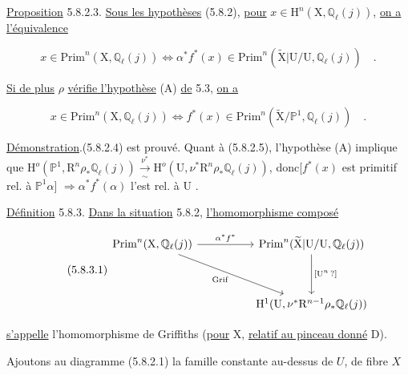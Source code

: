 \underline{Proposition} 5.8.2.3. \underline{Sous les hypothèses} (5.8.2), \underline{pour} $x \in \mathrm{H}^n(\mathrm{X},\mathbb{Q}_\ell(j))$, \underline{on a l'équivalence}

\begin{equation}\tag{5.8.2.4}
x \in \mathrm{Prim}^n(\mathrm{X},\mathbb{Q}_\ell(j)) \Longleftrightarrow \alpha^*f^*(x) \in \mathrm{Prim}^n(\widetilde{\mathrm{X}}|\mathrm{U}/\mathrm{U},\mathbb{Q}_\ell(j)) \quad .
\end{equation}

\underline{Si de plus} $\rho$ \underline{vérifie l'hypothèse} (A) \underline{de} 5.3, \underline{on a}

\begin{equation}\tag{5.8.2.5}
x \in \mathrm{Prim}^n(\mathrm{X},\mathbb{Q}_\ell(j)) \Longleftrightarrow f^*(x) \in \mathrm{Prim}^n(\widetilde{\mathrm{X}}/ \mathbb{P}^1,\mathbb{Q}_\ell(j)) \quad .
\end{equation}

\underline{Démonstration}.(5.8.2.4) est prouvé. Quant à (5.8.2.5), l'hypothèse (A) implique que $\mathrm{H}^o(\mathbb{P}^1,\mathrm{R}^n\rho_*\mathbb{Q}_\ell(j)) \overset{\nu^*}{\underset{\sim}{\longrightarrow}} \mathrm{H}^o(\mathrm{U},\nu^*\mathrm{R}^n\rho_*\mathbb{Q}_\ell(j))$, donc[$f^*(x)$ est primitif rel. à $\mathbb{P}^1\alpha$] $\Longrightarrow \alpha^*f^*(\alpha)$ l'est rel. à U .

\underline{Définition} 5.8.3. \underline{Dans la situation} 5.8.2, \underline{l'homomorphisme composé}

\begin{equation}\tag{5.8.3.1}
\begin{tikzcd}[column sep=huge, row sep=huge]
\mathrm{Prim}^n(\mathrm{X},\mathbb{Q}_\ell(j)) \arrow[r, "\alpha^*f^*"] \arrow[dr, "\mathrm{Grif}"'] & \mathrm{Prim}^n(\widetilde{\mathrm{X}}|\mathrm{U}/\mathrm{U},\mathbb{Q}_\ell(j)) \arrow[d, "{[\mathrm{U}^n\,?]}"] \\
{} & \mathrm{H}^1(\mathrm{U},\nu^*\mathrm{R}^{n-1}\rho_*\mathbb{Q}_\ell(j))
\end{tikzcd}
\end{equation}

\underline{s'appelle} l'homomorphisme de Griffiths (\underline{pour} X, \underline{relatif au pinceau donné} D).



Ajoutons au diagramme (5.8.2.1) la famille constante au-dessus de $U$, de fibre $X$


